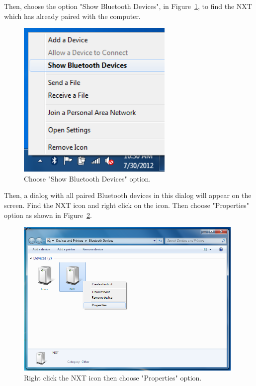 \documentclass[11pt]{article}
\begin{document}
Then, choose the option "Show Bluetooth Devices", in Figure~\ref{fig:bt_show_device}, to find the NXT which 
has already paired with the computer.

\begin{figure}[H]
  \begin{center}
    \includegraphics[height=3in]{figure/configuration/getBTaddress/btShowDevices.png}
    \caption{Choose "Show Bluetooth Devices" option.\label{fig:bt_show_device}}
  \end{center}
\end{figure}

Then, a dialog with all paired Bluetooth devices in this dialog will appear on the screen. Find the NXT icon
and right click on the icon. Then choose "Properties" option as shown in Figure~\ref{fig:bt_property}.

\begin{figure}[H]
  \begin{center}
    \includegraphics[height=3in]{figure/configuration/getBTaddress/btProperties.png}
    \caption{Right click the NXT icon then choose "Properties" option.\label{fig:bt_property}}
  \end{center}
\end{figure}
\end{document}
